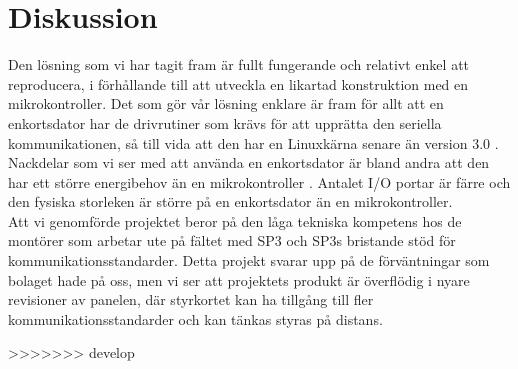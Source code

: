 \documentclass{article}
\begin{document}
    \section{Diskussion} %
    \label{sec:diskussion}


        Den lösning som vi har tagit fram är fullt fungerande och relativt enkel att reproducera, i förhållande till att utveckla en likartad konstruktion med en mikrokontroller. Det som gör vår lösning enklare är fram för allt att en enkortsdator har de drivrutiner som krävs för att upprätta den seriella kommunikationen, så till vida att den har en Linuxkärna senare än version 3.0 \cite{silicon}. \\


        \noindent Nackdelar som vi ser med att använda en enkortsdator är bland andra att den har ett större energibehov än en mikrokontroller \cite{gadgetBlog, rasp}. Antalet I/O portar är färre och den fysiska storleken är större på en enkortsdator än en mikrokontroller.\\

        \noindent Att vi genomförde projektet beror på den låga tekniska kompetens hos de montörer som arbetar ute på fältet med SP3 och SP3s bristande stöd för kommunikationsstandarder. Detta projekt svarar upp på de förväntningar som bolaget hade på oss, men vi ser att projektets produkt är överflödig i nyare revisioner av panelen, där styrkortet kan ha tillgång till fler kommunikationsstandarder och kan tänkas styras på distans.


    \clearpage
    \printbibliography      
>>>>>>> develop
\end{document}
